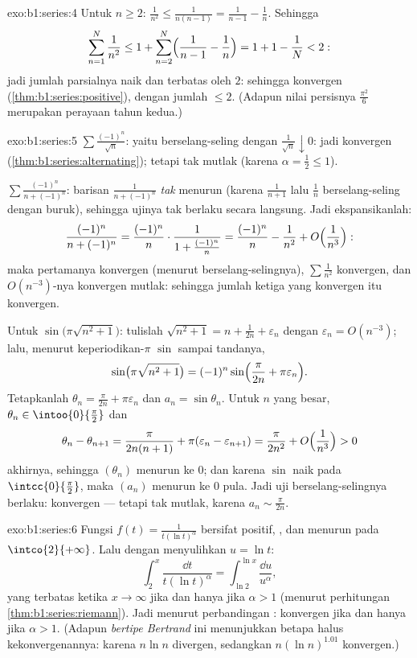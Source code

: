 \begin{solution}{exo:b1:series:4}
Untuk $n \geq 2$: $\frac{1}{n^2} \leq \frac{1}{n(n-1)} =
\frac{1}{n-1} - \frac1n$. Sehingga
\[
\sum_{n=1}^{N} \frac{1}{n^2} \leq 1 + \sum_{n=2}^{N}
\Bigl(\frac{1}{n-1} - \frac1n\Bigr) = 1 + 1 - \frac1N < 2 :
\]
jadi jumlah parsialnya naik dan terbatas oleh $2$: sehingga konvergen
(\cref{thm:b1:series:positive}), dengan jumlah $\leq 2$. (Adapun nilai persisnya
$\frac{\pi^2}{6}$ merupakan perayaan tahun kedua.)
\end{solution}

\begin{solution}{exo:b1:series:5}
$\sum \frac{(-1)^n}{\sqrt n}$: yaitu berselang-seling dengan $\frac{1}{\sqrt n}
\downarrow 0$: jadi konvergen (\cref{thm:b1:series:alternating}); tetapi tak
mutlak (karena $\alpha = \frac12 \leq 1$).

$\sum \frac{(-1)^n}{n + (-1)^n}$: barisan $\frac{1}{n +
(-1)^n}$ \emph{tak} menurun (karena $\frac{1}{n+1}$ lalu
$\frac{1}{n}$ berselang-seling dengan buruk), sehingga ujinya tak berlaku secara langsung.
Jadi ekspansikanlah:
\[
\frac{(-1)^n}{n + (-1)^n}
= \frac{(-1)^n}{n}\cdot\frac{1}{1 + \frac{(-1)^n}{n}}
= \frac{(-1)^n}{n} - \frac{1}{n^2} +
O\Bigl(\frac{1}{n^3}\Bigr):
\]
maka  pertamanya konvergen (menurut berselang-selingnya), $\sum \frac{1}{n^2}$
konvergen, dan $O(n^{-3})$-nya konvergen mutlak: sehingga jumlah ketiga
 yang konvergen itu konvergen.

Untuk $\sin\bigl(\pi\sqrt{n^2+1}\bigr)$: tulislah $\sqrt{n^2 + 1} = n +
\frac{1}{2n} + \varepsilon_n$ dengan $\varepsilon_n = O(n^{-3})$;
lalu, menurut keperiodikan-$\pi$ $\sin$ sampai tandanya,
\[
\sin\bigl(\pi\sqrt{n^2+1}\bigr)
= (-1)^n \sin\Bigl(\frac{\pi}{2n} + \pi\varepsilon_n\Bigr) .
\]
Tetapkanlah $\theta_n = \frac{\pi}{2n} + \pi\varepsilon_n$ dan $a_n =
\sin\theta_n$. Untuk $n$ yang besar, $\theta_n \in \intoo{0}{\frac\pi2}$
dan
\[
\theta_n - \theta_{n+1} = \frac{\pi}{2n(n+1)} +
\pi(\varepsilon_n - \varepsilon_{n+1})
= \frac{\pi}{2n^2} + O\Bigl(\frac{1}{n^3}\Bigr) > 0
\]
akhirnya, sehingga $(\theta_n)$ menurun ke $0$; dan karena $\sin$
naik pada $\intcc{0}{\frac\pi2}$, maka $(a_n)$ menurun ke $0$
pula. Jadi uji berselang-selingnya berlaku: konvergen --- tetapi tak mutlak,
karena $a_n \sim \frac{\pi}{2n}$.
\end{solution}

\begin{solution}{exo:b1:series:6}
Fungsi $f(t) = \frac{1}{t(\ln t)^\alpha}$ bersifat positif, , dan
menurun pada $\intco{2}{+\infty}$. Lalu dengan menyulihkan $u = \ln t$:
\[
\int_2^x \frac{\dd t}{t(\ln t)^\alpha}
= \int_{\ln 2}^{\ln x} \frac{\dd u}{u^\alpha},
\]
yang terbatas ketika $x \to \infty$ jika dan hanya jika $\alpha > 1$
(menurut perhitungan \cref{thm:b1:series:riemann}). Jadi menurut perbandingan
: konvergen jika dan hanya jika $\alpha > 1$. (Adapun  \emph{bertipe Bertrand}
ini menunjukkan betapa halus  kekonvergenannya: karena $n\ln n$
divergen, sedangkan $n(\ln n)^{1.01}$ konvergen.)
\end{solution}

